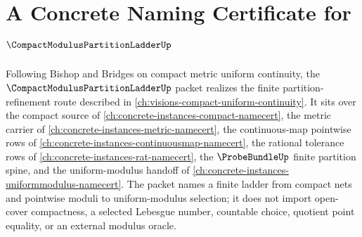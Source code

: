 \chapter{A Concrete Naming Certificate for $\CompactModulusPartitionLadderUp$}
\label{ch:concrete-instances-compact-modulus-partition-ladder-namecert}

Following Bishop and Bridges on compact metric uniform continuity, the $\CompactModulusPartitionLadderUp$ packet realizes the finite partition-refinement route described in \autoref{ch:visions-compact-uniform-continuity}. It sits over the compact source of \autoref{ch:concrete-instances-compact-namecert}, the metric carrier of \autoref{ch:concrete-instances-metric-namecert}, the continuous-map pointwise rows of \autoref{ch:concrete-instances-continuousmap-namecert}, the rational tolerance rows of \autoref{ch:concrete-instances-rat-namecert}, the $\ProbeBundleUp$ finite partition spine, and the uniform-modulus handoff of \autoref{ch:concrete-instances-uniformmodulus-namecert}. The packet names a finite ladder from compact nets and pointwise moduli to uniform-modulus selection; it does not import open-cover compactness, a selected Lebesgue number, countable choice, quotient point equality, or an external modulus oracle.

